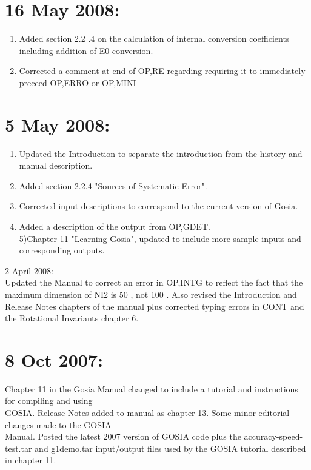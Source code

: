 \documentclass[10pt]{article}
\begin{document}
\section*{16 May 2008:}
\begin{enumerate}
  \item Added section 2.2 .4 on the calculation of internal conversion coefficients including addition of E0 conversion.
  \item Corrected a comment at end of OP,RE regarding requiring it to immediately preceed OP,ERRO or OP,MINI
\end{enumerate}

\section*{5 May 2008:}
\begin{enumerate}
  \item Updated the Introduction to separate the introduction from the history and manual description.
  \item Added section 2.2.4 "Sources of Systematic Error".
  \item Corrected input descriptions to correspond to the current version of Gosia.
  \item Added a description of the output from OP,GDET.\\
5)Chapter 11 "Learning Gosia", updated to include more sample inputs and corresponding outputs.
\end{enumerate}

2 April 2008:\\
Updated the Manual to correct an error in OP,INTG to reflect the fact that the maximum dimension of NI2 is 50 , not 100 . Also revised the Introduction and Release Notes chapters of the manual plus corrected typing errors in CONT and the Rotational Invariants chapter 6.

\section*{8 Oct 2007:}
Chapter 11 in the Gosia Manual changed to include a tutorial and instructions for compiling and using\\
GOSIA. Release Notes added to manual as chapter 13. Some minor editorial changes made to the GOSIA\\
Manual. Posted the latest 2007 version of GOSIA code plus the accuracy-speed-test.tar and g1demo.tar input/output files used by the GOSIA tutorial described in chapter 11.
\end{document}
